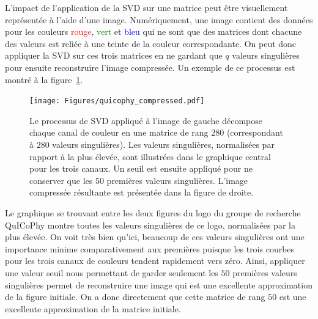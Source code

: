 L'impact de l'application de la SVD sur une matrice peut être visuellement représentée à l'aide d'une image.
Numériquement, une image contient des données pour les couleurs \textcolor{red}{rouge}, \textcolor{green}{vert} et \textcolor{blue}{bleu} qui ne sont que des matrices dont chacune des valeurs est reliée à une teinte de la couleur correspondante.
On peut donc appliquer la SVD sur ces trois matrices en ne gardant que $q$ valeurs singulières pour ensuite reconstruire l'image compressée.
Un exemple de ce processus est montré à la figure~\ref{fig:svd-on-figure}.
\begin{figure}[h]
    \centering
    \texttt{[image: Figures/quicophy\_compressed.pdf]}
    \caption{Le processus de SVD appliqué à l'image de gauche décompose chaque canal de couleur en une matrice de rang $280$ (correspondant à $280$ valeurs singulières). Les valeurs singulières, normalisées par rapport à la plus élevée, sont illustrées dans le graphique central pour les trois canaux. Un seuil est ensuite appliqué pour ne conserver que les $50$ premières valeurs singulières. L'image compressée résultante est présentée dans la figure de droite.}
    \label{fig:svd-on-figure}
\end{figure}
Le graphique se trouvant entre les deux figures du logo du groupe de recherche QuICoPhy montre toutes les valeurs singulières de ce logo, normalisées par la plus élevée.
On voit très bien qu'ici, beaucoup de ces valeurs singulières ont une importance minime comparativement aux premières puisque les trois courbes pour les trois canaux de couleurs tendent rapidement vers zéro.
Ainsi, appliquer une valeur seuil nous permettant de garder seulement les $50$ premières valeurs singulières permet de reconstruire une image qui est une excellente approximation de la figure initiale.
On a donc directement que cette matrice de rang $50$ est une excellente approximation de la matrice initiale.

